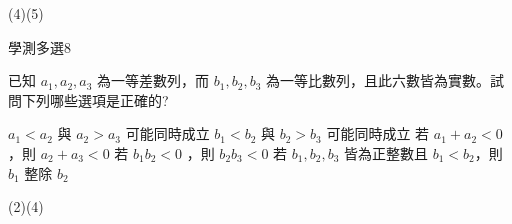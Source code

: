 \begin{QUESTIONS}
\begin{QUESTION}
\begin{QBODY}
        \end{QBODY}
        \begin{QFROMS}
        \end{QFROMS}
        \begin{QTAGS}\end{QTAGS}
        \begin{QANS}
            (4)(5)
        \end{QANS}
        \begin{QSOLLIST}
        \end{QSOLLIST}
        \begin{QEMPTYSPACE}
        \end{QEMPTYSPACE}
    \end{QUESTION}
    \begin{QUESTION}
        \begin{ExamInfo}{97}{學測}{多選}{8}
        \end{ExamInfo}
        \begin{ExamAnsRateInfo}{36}{57}{36}{15}
        \end{ExamAnsRateInfo}
        \begin{QBODY}
            已知 $a_1 , a_2 , a_3$ 為一等差數列，而 $b_1 , b_2 , b_3$ 為一等比數列，且此六數皆為實數。試問下列哪些選項是正確的?
			\begin{QOPS} 
				\QOP  $a_1 <a_2$ 與 $a_2 >a_3$ 可能同時成立 
				\QOP $b_1 <b_2$ 與 $b_2 >b_3$ 可能同時成立 \quad 
				\QOP 若 $a_1 +a_2 <0$，則 $a_2 +a_3 <0$ 
				\QOP 若 $b_1b_2 <0$ ，則 $b_2b_3 <0$ 
				\QOP 若 $b_1,b_2,b_3$ 皆為正整數且 $b_1 <b_2$，則 $b_1$ 整除 $b_2$
			\end{QOPS}
        \end{QBODY}
        \begin{QFROMS}
        \end{QFROMS}
        \begin{QTAGS}\end{QTAGS}
        \begin{QANS}
            (2)(4)
        \end{QANS}
        \begin{QSOLLIST}
        \end{QSOLLIST}
        \begin{QEMPTYSPACE}
        \end{QEMPTYSPACE}
    \end{QUESTION}
    \begin{QUESTION}

\end{QUESTION}
\end{QUESTIONS}
